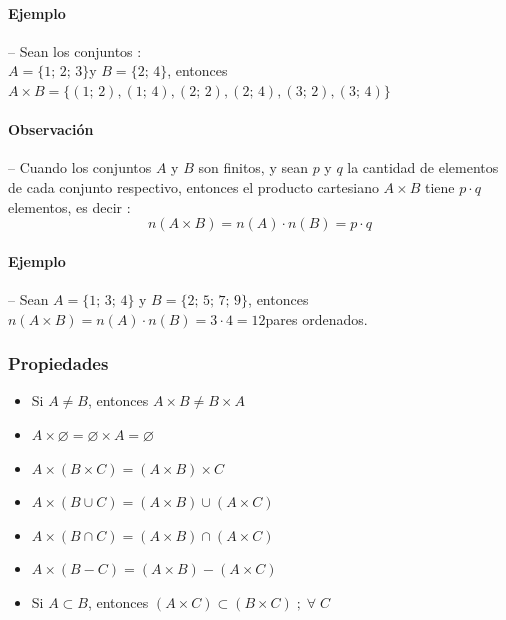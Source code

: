 \documentclass{article}
\begin{document}
\paragraph*{Ejemplo} -- Sean los conjuntos : \\ $A = \{1;\,2;\,3\}$\quad y \quad$B = \{2;\,4\}$, entonces \\ $A\times B = \{(1;\,2), (1;\,4), (2;\,2), (2;\,4), (3;\,2), (3;\,4)\}$

\paragraph*{Observación} -- Cuando los conjuntos $A$ y $B$ son finitos, y sean $p$ y $q$ la cantidad de elementos de cada conjunto respectivo, entonces el producto cartesiano $A\times B$ tiene $p\cdot q$ elementos, es decir :
$$ n(A\times B) = n(A) \cdot n(B) = p\cdot q$$
\paragraph*{Ejemplo} -- Sean $A = \{1;\,3;\,4\}$ y  $B = \{2;\,5;\,7;\,9\}$, entonces \\ $n(A\times B) = n(A) \cdot n(B) = 3 \cdot 4  = 12$\;pares ordenados.
\subsubsection*{Propiedades} %
\begin{itemize}
\item{Si $A \neq B$, entonces $A\times B \neq B\times A$}
\item{$A\times\varnothing = \varnothing\times A = \varnothing$}
\item{$A\times (B \times C) = (A \times B) \times C$}
\item{$A\times (B \cup C) = (A\times B) \cup (A\times C) $}
\item{$A\times (B \cap C) = (A\times B) \cap (A\times C)$}
\item{$A\times (B - C) = (A\times B) - (A\times C)$}
\item{Si $A \subset B$, entonces $(A\times C) \subset (B\times C)\;;\;\forall\; C$}
\end{itemize}
\end{document}
